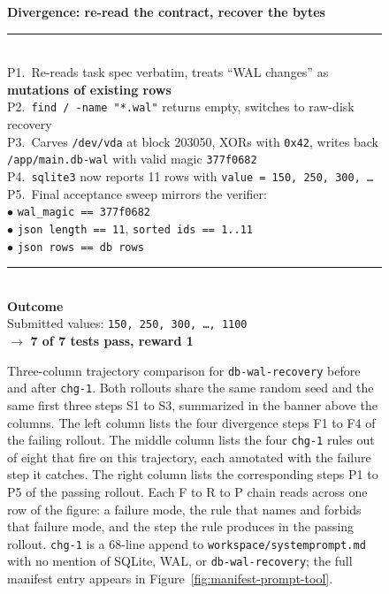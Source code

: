 \begin{figure}[t]
\begin{tcbraster}
\begin{tcolorbox}[colback=aheTeal!12,colframe=aheBlue,colbacktitle=aheBlue,
                          title={\scriptsize\textbf{After \texttt{chg-1}, same seed, iteration 2, reward 1.0}}]
            \textbf{\textcolor{aheBlue}{Divergence: re-read the contract, recover the bytes}} \\
            \rule{\linewidth}{0.3pt}\\[1pt]
            P1.~Re-reads task spec verbatim, treats ``WAL changes'' as \textbf{mutations of existing rows} \\[2pt]
            P2.~\texttt{find / -name "*.wal"} returns empty, switches to raw-disk recovery \\[2pt]
            P3.~Carves \texttt{/dev/vda} at block 203050, XORs with \texttt{0x42}, writes back \texttt{/app/main.db-wal} with valid magic \texttt{377f0682} \\[2pt]
            P4.~\texttt{sqlite3} now reports 11 rows with \texttt{value = 150, 250, 300, \dots} \\[2pt]
            P5.~Final acceptance sweep mirrors the verifier: \\
            \phantom{P5.~}$\bullet$ \texttt{wal\_magic == 377f0682} \\
            \phantom{P5.~}$\bullet$ \texttt{json length == 11}, \texttt{sorted ids == 1..11} \\
            \phantom{P5.~}$\bullet$ \texttt{json rows == db rows} \\[3pt]
            \rule{\linewidth}{0.3pt}\\
            \textbf{\textcolor{aheBlue}{Outcome}} \\
            Submitted values: \texttt{150, 250, 300, \dots, 1100} \\
            $\rightarrow$ \textbf{7 of 7 tests pass, reward 1}
        \end{tcolorbox}
    \end{tcbraster}
    \caption{Three-column trajectory comparison for \texttt{db-wal-recovery} before and after \texttt{chg-1}. Both rollouts share the same random seed and the same first three steps S1 to S3, summarized in the banner above the columns. The left column lists the four divergence steps F1 to F4 of the failing rollout. The middle column lists the four \texttt{chg-1} rules out of eight that fire on this trajectory, each annotated with the failure step it catches. The right column lists the corresponding steps P1 to P5 of the passing rollout. Each F to R to P chain reads across one row of the figure: a failure mode, the rule that names and forbids that failure mode, and the step the rule produces in the passing rollout. \texttt{chg-1} is a 68-line append to \texttt{workspace/systemprompt.md} with no mention of SQLite, WAL, or \texttt{db-wal-recovery}; the full manifest entry appears in Figure~\ref{fig:manifest-prompt-tool}.}
    \label{fig:case-trajectory}
\end{figure}
